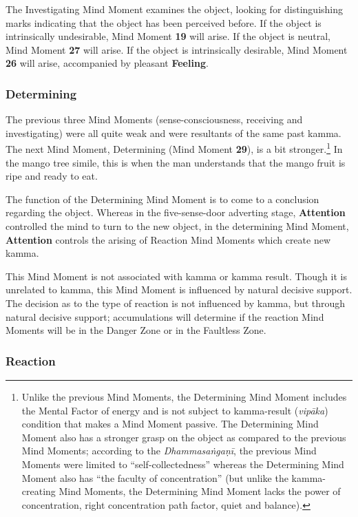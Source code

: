 The Investigating Mind Moment examines the object, looking for distinguishing marks indicating that the object has been perceived before. If the object is intrinsically undesirable, Mind Moment \textbf{19} will arise. If the object is neutral, Mind Moment \textbf{27} will arise. If the object is intrinsically desirable, Mind Moment \textbf{26} will arise, accompanied by pleasant \textbf{Feeling}.

\subsubsection*{Determining}

The previous three Mind Moments (sense-consciousness, receiving and investigating) were all quite weak and were resultants of the same past kamma. The next Mind Moment, Determining (Mind Moment \textbf{29}), is a bit stronger.\footnote{Unlike the previous Mind Moments, the Determining Mind Moment includes the Mental Factor of energy and is not subject to kamma-result (\textit{vipāka}) condition that makes a Mind Moment passive. The Determining Mind Moment also has a stronger grasp on the object as compared to the previous Mind Moments; according to the \textit{Dhammasaṅgaṇī}, the previous Mind Moments were limited to “self-collectedness” whereas the Determining Mind Moment also has “the faculty of concentration” (but unlike the kamma-creating Mind Moments, the Determining Mind Moment lacks the power of concentration, right concentration path factor, quiet and balance).} In the mango tree simile, this is when the man understands that the mango fruit is ripe and ready to eat.

The function of the Determining Mind Moment is to come to a conclusion regarding the object. Whereas in the five-sense-door adverting stage, \textbf{Attention} controlled the mind to turn to the new object, in the determining Mind Moment, \textbf{Attention} controls the arising of Reaction Mind Moments which create new kamma.

This Mind Moment is not associated with kamma or kamma result. Though it is unrelated to kamma, this Mind Moment is influenced by natural decisive support. The decision as to the type of reaction is not influenced by kamma, but through natural decisive support; accumulations will determine if the reaction Mind Moments will be in the Danger Zone or in the Faultless Zone.

\subsubsection*{Reaction}

